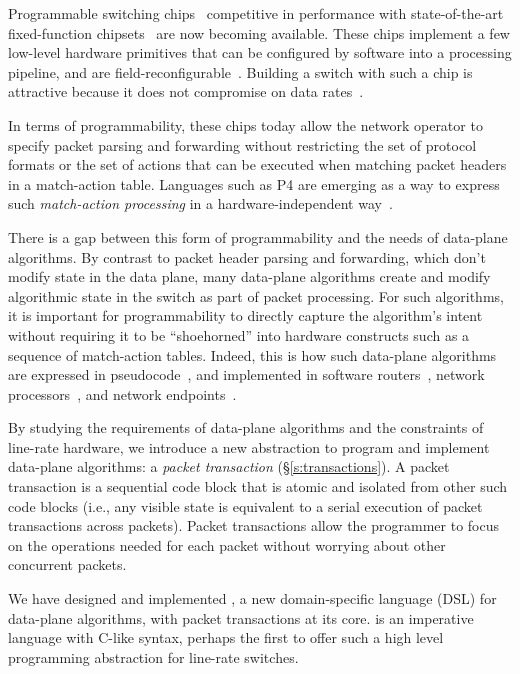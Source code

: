 Programmable switching chips~\cite{flexpipe, xpliant, rmt, corsa,
  uadp, algo_logic} competitive in performance with state-of-the-art
fixed-function chipsets~\cite{trident, tomahawk, mellanox} are now
becoming available. These chips implement a few low-level hardware
primitives that can be configured by software into a processing
pipeline, and are
field-reconfigurable~\cite{xpliant_sdk,xpliant_sdk2,intel_sdk}. Building
a switch with such a chip is attractive because it does not compromise
on data rates~\cite{rmt}.

In terms of programmability, these chips today allow the network
operator to specify packet parsing and forwarding without restricting
the set of protocol formats or the set of actions that can be executed
when matching packet headers in a match-action table. Languages such
as P4 are emerging as a way to express such {\em match-action
  processing} in a hardware-independent way~\cite{p4,p4spec,dc_p4}.

There is a gap between this form of programmability and the needs of data-plane
algorithms. By contrast to packet header parsing and forwarding, which don't
modify state in the data plane, many data-plane algorithms create and modify
algorithmic state in the switch as part of packet processing. For such
algorithms, it is important for programmability to directly capture the
algorithm's intent without requiring it to be ``shoehorned'' into hardware
constructs such as a sequence of match-action tables. Indeed, this is how such
data-plane algorithms are expressed in pseudocode~\cite{red, csfq, codel_code,
avq, blue}, and implemented in software routers~\cite{click, dpdk,
routebricks}, network processors~\cite{packetc, nova}, and network
endpoints~\cite{qdisc}.

By studying the requirements of data-plane algorithms and the
constraints of line-rate hardware, we introduce a new abstraction to
program and implement data-plane algorithms: a {\em packet
  transaction} (\S\ref{s:transactions}). A packet transaction is a
sequential code block that is atomic and isolated from other such code
blocks (i.e., any visible state is equivalent to a serial execution of
packet transactions across packets). Packet transactions allow the programmer to
focus on the operations needed for each packet without worrying about
other concurrent packets.

We have designed and implemented {\em \pktlanguage{}}, a new
domain-specific language (DSL) for data-plane algorithms, with packet
transactions at its core.  \pktlanguage is an imperative language with
C-like syntax, perhaps the first to offer such a high level
programming abstraction for line-rate switches.

